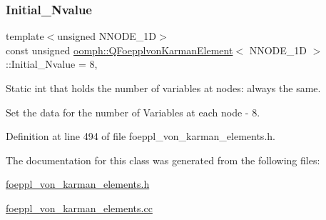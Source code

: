 \subsubsection{\texorpdfstring{Initial\+\_\+\+Nvalue}{Initial\_Nvalue}}
{\footnotesize\ttfamily template$<$unsigned N\+N\+O\+D\+E\+\_\+1D$>$ \\
const unsigned \hyperlink{classoomph_1_1QFoepplvonKarmanElement}{oomph\+::\+Q\+Foepplvon\+Karman\+Element}$<$ N\+N\+O\+D\+E\+\_\+1D $>$\+::Initial\+\_\+\+Nvalue = 8\hspace{0.3cm}{\ttfamily [static]}, {\ttfamily [private]}}



Static int that holds the number of variables at nodes\+: always the same. 

Set the data for the number of Variables at each node -\/ 8. 

Definition at line 494 of file foeppl\+\_\+von\+\_\+karman\+\_\+elements.\+h.



The documentation for this class was generated from the following files\+:\begin{DoxyCompactItemize}
\item 
\hyperlink{foeppl__von__karman__elements_8h}{foeppl\+\_\+von\+\_\+karman\+\_\+elements.\+h}\item 
\hyperlink{foeppl__von__karman__elements_8cc}{foeppl\+\_\+von\+\_\+karman\+\_\+elements.\+cc}\end{DoxyCompactItemize}
